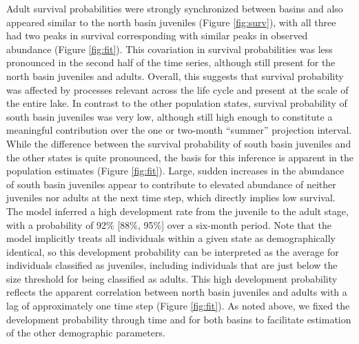 \documentclass[11pt]{article}
\begin{document}
{Adult survival probabilities were strongly synchronized between basins 
and also appeared similar to the north basin juveniles (Figure \ref{fig:surv}),
with all three had two peaks in survival corresponding with 
similar peaks in observed abundance (Figure \ref{fig:fit}).
This covariation in survival probabilities was less pronounced in the second half 
of the time series, although still present for the north basin juveniles and adults.
Overall, this suggests that survival probability was affected by processes relevant across 
the life cycle and present at the scale of the entire lake.
In contrast to the other population states, 
survival probability of south basin juveniles was very low,
although still high enough to constitute a meaningful contribution over the one or two-month
``summer'' projection interval.
While the difference between the survival probability of south basin juveniles and 
the other states is quite pronounced, 
the basis for this inference is apparent 
in the population estimates (Figure \ref{fig:fit}). 
Large, sudden increases in the abundance of south basin juveniles appear to contribute
to elevated abundance of neither juveniles nor adults at the next time step,
which directly implies low survival.
The model inferred a high development rate from the juvenile to the adult stage,
with a probability of 92\% [88\%, 95\%] over a six-month period. 
Note that the model implicitly treats all individuals within a given state 
as demographically identical,
so this development probability can be interpreted as the average 
for individuals classified as juveniles, 
including individuals that are just below the size threshold for being classified as adults.
This high development probability reflects the apparent correlation between north basin
juveniles and adults with a lag of approximately one time step (Figure \ref{fig:fit}).
As noted above, we fixed the development probability through time and for both basins
to facilitate estimation of the other demographic parameters.

}
\end{document}
